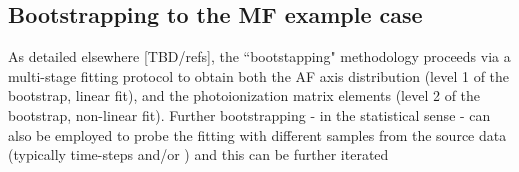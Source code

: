 \subsection{Bootstrapping to the MF example case}

As detailed elsewhere [TBD/refs], the ``bootstapping" methodology proceeds via a multi-stage fitting protocol to obtain both the AF axis distribution (level 1 of the bootstrap, linear fit), and the photoionization matrix elements (level 2 of the bootstrap, non-linear fit). Further bootstrapping - in the statistical sense - can also be employed to probe the fitting with different samples from the source data (typically time-steps and/or ) and this can be further iterated 